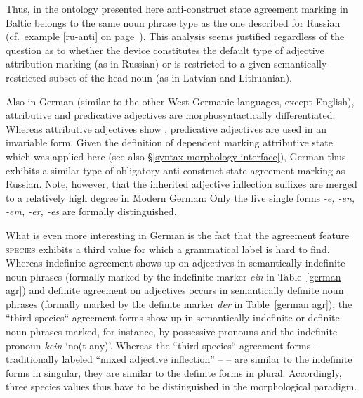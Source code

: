Thus, in the ontology presented here anti\hyp{}construct state agreement marking in Baltic belongs to the same noun phrase type as the one described for Russian (cf.~example \ref{ru-anti} on page~\pageref{ru-anti}). This analysis seems justified regardless of the question as to whether the device constitutes the default type of adjective attribution marking (as in Russian) or is restricted to a given semantically restricted subset of the head noun (as in Latvian and Lithuanian).

Also in German (similar to the other West Germanic languages, except English), attributive and predicative adjectives are morphosyntactically differentiated. Whereas attributive adjectives show , predicative adjectives are used in an invariable form. Given the definition of dependent marking attributive state which was applied here (see also \S\ref{syntax-morphology-interface}), German thus exhibits a similar type of obligatory anti\hyp{}construct state agreement marking as Russian. Note, however, that the inherited adjective inflection suffixes are merged to a relatively high degree in Modern German: Only the five single forms \textit{-e, -en, -em, -er, -es} are formally distinguished.

What is even more interesting in German is the fact that the agreement feature \textsc{species} exhibits a third value for which a grammatical label is hard to find. Whereas indefinite agreement shows up on adjectives in semantically indefinite noun phrases (formally marked by the indefinite marker \textit{ein} in Table~\ref{german agr}) and definite agreement on adjectives occurs in semantically definite noun phrases (formally marked by the definite marker \textit{der} in Table~\ref{german agr}), the “third species“ agreement forms show up in semantically indefinite or definite noun phrases marked, for instance, by possessive pronouns and the indefinite pronoun \textit{kein} ‘no(t any)’. Whereas the “third species“ agreement forms – traditionally labeled “mixed adjective inflection” – \citep[cf.][244–245]{schafer2015a} – are similar to the indefinite forms in singular, they are similar to the definite forms in plural. Accordingly, three species values thus have to be distinguished in the morphological paradigm.

